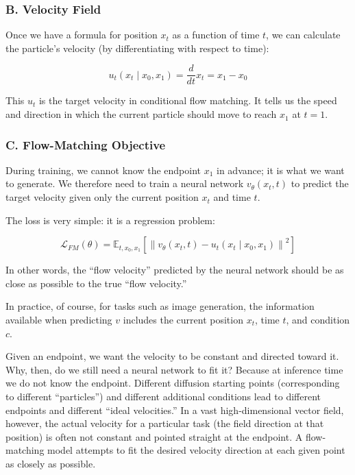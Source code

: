 \hypertarget{b.-velocity-field}{%
\subsubsection{B. Velocity Field}\label{b.-velocity-field}}

Once we have a formula for position \(x_t\) as a function of time \(t\), we can calculate the particle's velocity (by differentiating with respect to time):

\[
u_t(x_t\mid x_0,x_1)=\frac{d}{dt}x_t=x_1-x_0
\]

This \(u_t\) is the target velocity in conditional flow matching. It tells us the speed and direction in which the current particle should move to reach \(x_1\) at \(t=1\).

\hypertarget{c.-flow-matching-objective}{%
\subsubsection{C. Flow-Matching Objective}\label{c.-flow-matching-objective}}

During training, we cannot know the endpoint \(x_1\) in advance; it is what we want to generate. We therefore need to train a neural network \(v_\theta(x_t,t)\) to predict the target velocity given only the current position \(x_t\) and time \(t\).

The loss is very simple: it is a regression problem:

\[
\mathcal{L}_{FM}(\theta)=\mathbb{E}_{t,x_0,x_1}\left[\left\|v_\theta(x_t,t)-u_t(x_t\mid x_0,x_1)\right\|^2\right]
\]

In other words, the ``flow velocity'' predicted by the neural network should be as close as possible to the true ``flow velocity.''

In practice, of course, for tasks such as image generation, the information available when predicting \(v\) includes the current position \(x_t\), time \(t\), and condition \(c\).

Given an endpoint, we want the velocity to be constant and directed toward it. Why, then, do we still need a neural network to fit it? Because at inference time we do not know the endpoint. Different diffusion starting points (corresponding to different ``particles'') and different additional conditions lead to different endpoints and different ``ideal velocities.'' In a vast high-dimensional vector field, however, the actual velocity for a particular task (the field direction at that position) is often not constant and pointed straight at the endpoint. A flow-matching model attempts to fit the desired velocity direction at each given point as closely as possible.

